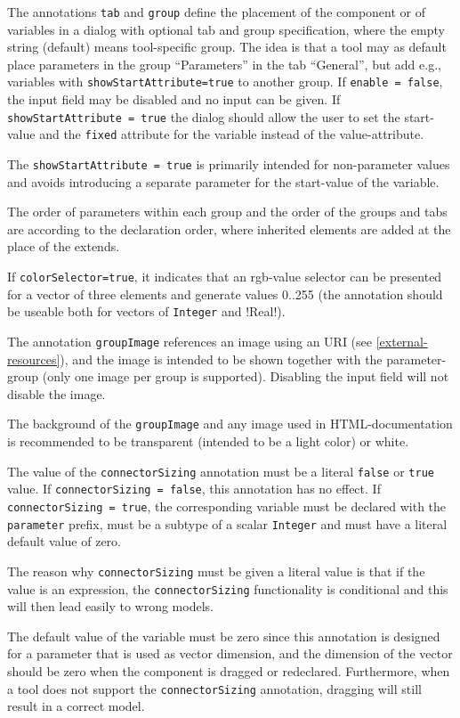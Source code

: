The annotations \lstinline!tab! and \lstinline!group! define the placement of
the component or of variables in a dialog with optional tab and group
specification, where the empty string (default) means tool-specific group.
The idea is that a tool may as default place parameters in the group ``Parameters'' in the tab ``General'',
but add e.g., variables with \lstinline!showStartAttribute=true! to another group.
If \lstinline!enable = false!, the input field may
be disabled and no input can be given. If \lstinline!showStartAttribute = true! the dialog should allow the user to
set the start-value and the \lstinline!fixed! attribute for the variable instead of the value-attribute.

\begin{nonnormative}
The \lstinline!showStartAttribute = true! is primarily intended for non-parameter values and avoids introducing
a separate parameter for the start-value of the variable.
\end{nonnormative}

The order of parameters within each group and the order of the groups and tabs are according
to the declaration order, where inherited elements are added at the place of the extends.

If \lstinline!colorSelector=true!, it indicates that an rgb-value selector can be
presented for a vector of three elements and generate values 0..255 (the
annotation should be useable both for vectors of \lstinline!Integer! and !Real!).

The annotation \lstinline!groupImage! references an image using an URI (see
\cref{external-resources}), and the image is intended to be shown together with the
parameter-group (only one image per group is supported). Disabling the
input field will not disable the image.

The background of the \lstinline!groupImage! and any image used in HTML-documentation is recommended to be transparent (intended to be a light color) or white.

The value of the \lstinline!connectorSizing! annotation must be a literal
\lstinline!false! or \lstinline!true! value. If \lstinline!connectorSizing = false!, this annotation has no effect.
If \lstinline!connectorSizing = true!, the corresponding variable must be declared with the
\lstinline!parameter! prefix, must be a subtype of a scalar \lstinline!Integer! and
must have a literal default value of zero.

\begin{nonnormative}
The reason why \lstinline!connectorSizing! must be given a literal value is that if the value is an expression,
the \lstinline!connectorSizing! functionality is conditional and this will then lead easily to wrong models.

The default value of the variable must be zero since this annotation
is designed for a parameter that is used as vector dimension, and the
dimension of the vector should be zero when the component is dragged or
redeclared.  Furthermore, when a tool does not support the
\lstinline!connectorSizing! annotation, dragging will still result in a correct
model.
\end{nonnormative}

